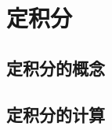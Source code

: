 \documentclass[8pt a4paper, oneside, UTF8]{ctexbook}  %
\begin{document}
\begin{sloppypar}
    \else
    \fi
    \chapter{定积分}
    \section{定积分的概念}
    \section{定积分的计算}
    \ifx\allfiles\undefined
\end{sloppypar}
\end{document}
